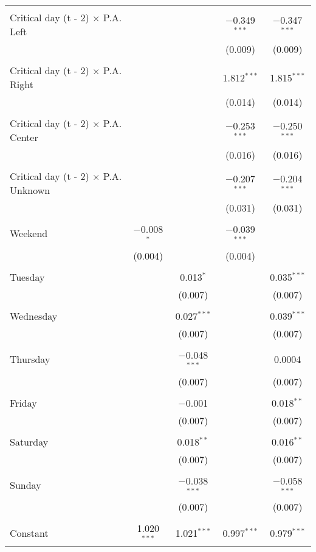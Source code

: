 \documentclass[
]{article}
\begin{document}
\begin{table}[!htbp]
{\begin{tabular}{@{\extracolsep{5pt}}lcccc}
  & & & & \\ 
 Critical day (t - 2) $\times$ P.A. Left &  &  & $-$0.349$^{***}$ & $-$0.347$^{***}$ \\ 
  &  &  & (0.009) & (0.009) \\ 
  & & & & \\ 
 Critical day (t - 2) $\times$ P.A. Right &  &  & 1.812$^{***}$ & 1.815$^{***}$ \\ 
  &  &  & (0.014) & (0.014) \\ 
  & & & & \\ 
 Critical day (t - 2) $\times$ P.A. Center &  &  & $-$0.253$^{***}$ & $-$0.250$^{***}$ \\ 
  &  &  & (0.016) & (0.016) \\ 
  & & & & \\ 
 Critical day (t - 2) $\times$ P.A. Unknown &  &  & $-$0.207$^{***}$ & $-$0.204$^{***}$ \\ 
  &  &  & (0.031) & (0.031) \\ 
  & & & & \\ 
 Weekend & $-$0.008$^{*}$ &  & $-$0.039$^{***}$ &  \\ 
  & (0.004) &  & (0.004) &  \\ 
  & & & & \\ 
 Tuesday &  & 0.013$^{*}$ &  & 0.035$^{***}$ \\ 
  &  & (0.007) &  & (0.007) \\ 
  & & & & \\ 
 Wednesday &  & 0.027$^{***}$ &  & 0.039$^{***}$ \\ 
  &  & (0.007) &  & (0.007) \\ 
  & & & & \\ 
 Thursday &  & $-$0.048$^{***}$ &  & 0.0004 \\ 
  &  & (0.007) &  & (0.007) \\ 
  & & & & \\ 
 Friday &  & $-$0.001 &  & 0.018$^{**}$ \\ 
  &  & (0.007) &  & (0.007) \\ 
  & & & & \\ 
 Saturday &  & 0.018$^{**}$ &  & 0.016$^{**}$ \\ 
  &  & (0.007) &  & (0.007) \\ 
  & & & & \\ 
 Sunday &  & $-$0.038$^{***}$ &  & $-$0.058$^{***}$ \\ 
  &  & (0.007) &  & (0.007) \\ 
  & & & & \\ 
 Constant & 1.020$^{***}$ & 1.021$^{***}$ & 0.997$^{***}$ & 0.979$^{***}$ \\ 

\end{tabular}}
\end{table}
\end{document}
